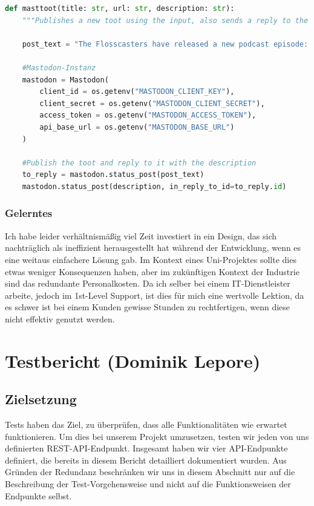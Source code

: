 \documentclass{article}
\begin{document}
\begin{lstlisting}[language=Python, caption=Vollständige Funktion des \textit{Autotootings}]
def masttoot(title: str, url: str, description: str):
    """Publishes a new toot using the input, also sends a reply to the announcement with the description."""

    post_text = "The Flosscasters have released a new podcast episode: " + title + ". Check it out @ " + url

    #Mastodon-Instanz
    mastodon = Mastodon(
        client_id = os.getenv("MASTODON_CLIENT_KEY"),
        client_secret = os.getenv("MASTODON_CLIENT_SECRET"),
        access_token = os.getenv("MASTODON_ACCESS_TOKEN"),
        api_base_url = os.getenv("MASTODON_BASE_URL")
    )

    #Publish the toot and reply to it with the description
    to_reply = mastodon.status_post(post_text)
    mastodon.status_post(description, in_reply_to_id=to_reply.id)
\end{lstlisting}

\subsubsection{Gelerntes}

Ich habe leider verhältnismäßig viel Zeit investiert in ein Design, das sich nachträglich als ineffizient herausgestellt hat während der Entwicklung, wenn es eine weitaus einfachere Lösung gab. Im Kontext eines Uni-Projektes sollte dies etwas weniger Konsequenzen haben, aber im zukünftigen Kontext der Industrie sind das redundante Personalkosten. Da ich selber bei einem IT-Dienstleister arbeite, jedoch im 1st-Level Support, ist dies für mich eine wertvolle Lektion, da es schwer ist bei einem Kunden gewisse Stunden zu rechtfertigen, wenn diese nicht effektiv genutzt werden.

\section{Testbericht \small{(Dominik Lepore)}}
\subsection{Zielsetzung}

Tests haben das Ziel, zu überprüfen, dass alle Funktionalitäten wie erwartet funktionieren. Um dies bei unserem Projekt umzusetzen, testen wir jeden von uns definierten REST-API-Endpunkt. Insgesamt haben wir vier API-Endpunkte definiert, die bereits in diesem Bericht detailliert dokumentiert wurden. Aus Gründen der Redundanz beschränken wir uns in diesem Abschnitt nur auf die Beschreibung der Test-Vorgehensweise und nicht auf die Funktionsweisen der Endpunkte selbst. 
\end{document}
